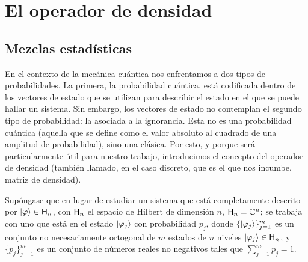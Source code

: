 \section{El operador de densidad}

\subsection{Mezclas estadísticas}


En el contexto de la mecánica cuántica nos enfrentamos a dos tipos de probabilidades. La primera, la probabilidad cuántica, está codificada dentro de los vectores de estado que se utilizan para describir el estado en el que se puede hallar un sistema. Sin embargo, los vectores de estado no contemplan el segundo tipo de probabilidad: la asociada a la ignorancia. Esta no es una probabilidad cuántica (aquella que se define como el valor absoluto al cuadrado de una amplitud de probabilidad), sino una clásica. Por esto, y porque será particularmente útil para nuestro trabajo, introducimos el concepto del operador de densidad (también llamado, en el caso discreto, que es el que nos incumbe, matriz de densidad).


Supóngase que en lugar de estudiar un sistema que está completamente descrito por $\ket{\varphi}\in{\sf H}_{n}$, con ${\sf H}_{n}$ el espacio de Hilbert de dimensión $n$, \ie{} ${\sf H}_{n}=\mathbb{C}^{n}$; se trabaja con uno que está en el estado $\ket{\varphi_{j}}$ con probabilidad $p_{j}$, donde $\{\ket{\varphi_{j}}\}_{j=1}^{m}$ es un conjunto no necesariamente ortogonal de $m$ estados de $n$ niveles $\ket{\varphi_{j}}\in{\sf H}_{n}$, y $\{p_{j}\}_{j=1}^{m}$ es un conjunto de números reales no negativos tales que $\sum_{j=1}^{m} p_{j}=1$.

